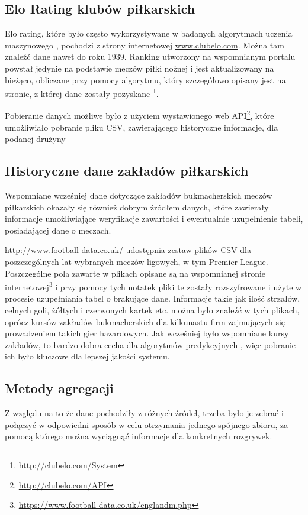         \subsection{Elo Rating klubów piłkarskich}
        \noindent Elo rating, które było często wykorzystywane w badanych algorytmach uczenia maszynowego \cite{EloRating-1}, pochodzi z strony internetowej \url{www.clubelo.com}. Można tam znaleźć dane nawet do roku 1939. Ranking utworzony na wspomnianym portalu powstał jedynie na podstawie meczów piłki nożnej i jest aktualizowany na bieżąco, obliczane przy pomocy algorytmu, który szczegółowo opisany jest na stronie, z której dane zostały pozyskane \footnote{\url{http://clubelo.com/System}}.
        
        Pobieranie danych możliwe było z użyciem wystawionego web API\footnote{\url{http://clubelo.com/API}}, które umożliwiało pobranie pliku CSV, zawierającego historyczne informacje, dla podanej drużyny
        \subsection{Historyczne dane zakładów piłkarskich} \label{subsec:football-data}
         \noindent Wspomniane wcześniej dane dotyczące zakładów bukmacherskich meczów piłkarskich okazały się również dobrym źródłem danych, które zawierały informacje umożliwiające weryfikacje zawartości i ewentualnie uzupełnienie tabeli, posiadającej dane o meczach. 
         
         \noindent \url{http://www.football-data.co.uk/} udostępnia zestaw plików CSV dla poszczególnych lat wybranych meczów ligowych, w tym Premier League. Poszczególne pola zawarte w plikach opisane są na wspomnianej stronie internetowej\footnote{\url{https://www.football-data.co.uk/englandm.php}} i przy pomocy tych notatek pliki te zostały rozszyfrowane i użyte w procesie uzupełniania tabel o brakujące dane. Informacje takie jak ilość strzałów, celnych goli, żółtych i czerwonych kartek etc. można było znaleźć w tych plikach, oprócz kursów zakładów bukmacherskich dla kilkunastu firm zajmujących się prowadzeniem takich gier hazardowych. Jak wcześniej było wspomniane kursy zakładów, to bardzo dobra cecha dla algorytmów predykcyjnych \cite{EloRating-1}, więc pobranie ich było kluczowe dla lepszej jakości systemu.
        
        \subsection{Metody agregacji}
        \noindent Z względu na to że dane pochodziły z różnych źródeł, trzeba było je zebrać i połączyć w odpowiedni sposób w celu otrzymania jednego spójnego zbioru, za pomocą którego można wyciągnąć informacje dla konkretnych rozgrywek. 
        
